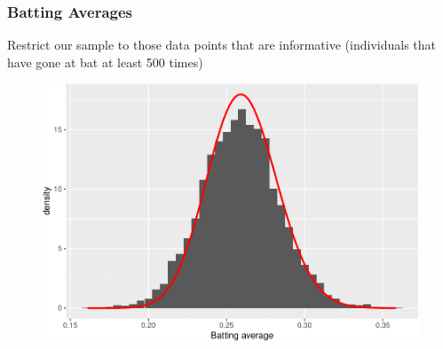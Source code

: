 \documentclass[
  shownotes,
  xcolor={svgnames},
  hyperref={colorlinks,citecolor=DarkBlue,linkcolor=DarkRed,urlcolor=DarkBlue}
  , aspectratio=169]{beamer}
\begin{document}
\begin{frame}[fragile]
\frametitle{Batting Averages}
Restrict our sample to those data points that are  informative (individuals that have gone at bat at least 500 times)

\bigskip

\begin{figure}[H] \centering
  \centering
  \includegraphics[scale=0.4]{figures/av_hist_w_mle.pdf}
  \\
  \tiny 
\end{figure}


\end{frame}
\end{document}
